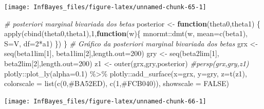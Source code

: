 \documentclass[
]{book}
\newenvironment{Shaded}{\begin{snugshade}}{\end{snugshade}}
\newcommand{\AttributeTok}[1]{\textcolor[rgb]{0.77,0.63,0.00}{#1}}
\newcommand{\CommentTok}[1]{\textcolor[rgb]{0.56,0.35,0.01}{\textit{#1}}}
\newcommand{\ConstantTok}[1]{\textcolor[rgb]{0.00,0.00,0.00}{#1}}
\newcommand{\ControlFlowTok}[1]{\textcolor[rgb]{0.13,0.29,0.53}{\textbf{#1}}}
\newcommand{\DecValTok}[1]{\textcolor[rgb]{0.00,0.00,0.81}{#1}}
\newcommand{\FloatTok}[1]{\textcolor[rgb]{0.00,0.00,0.81}{#1}}
\newcommand{\FunctionTok}[1]{\textcolor[rgb]{0.00,0.00,0.00}{#1}}
\newcommand{\NormalTok}[1]{#1}
\newcommand{\OtherTok}[1]{\textcolor[rgb]{0.56,0.35,0.01}{#1}}
\newcommand{\SpecialCharTok}[1]{\textcolor[rgb]{0.00,0.00,0.00}{#1}}
\newcommand{\StringTok}[1]{\textcolor[rgb]{0.31,0.60,0.02}{#1}}
\begin{document}
\begin{center}\texttt{[image: InfBayes\_files/figure-latex/unnamed-chunk-65-1]} \end{center}

\begin{Shaded}
\begin{Highlighting}[]
\CommentTok{\# posteriori marginal bivariada dos betas}
\NormalTok{posterior }\OtherTok{\textless{}{-}} \ControlFlowTok{function}\NormalTok{(theta0,theta1) \{ }\FunctionTok{apply}\NormalTok{(}\FunctionTok{cbind}\NormalTok{(theta0,theta1),}\DecValTok{1}\NormalTok{,}\ControlFlowTok{function}\NormalTok{(w)\{ mnormt}\SpecialCharTok{::}\FunctionTok{dmt}\NormalTok{(w, }\AttributeTok{mean=}\FunctionTok{c}\NormalTok{(beta1), }\AttributeTok{S=}\NormalTok{V, }\AttributeTok{df=}\DecValTok{2}\SpecialCharTok{*}\NormalTok{a1)  \}) \}}
\CommentTok{\# Gráfico da posteriori marginal bivariada dos betas}
\NormalTok{grx }\OtherTok{\textless{}{-}} \FunctionTok{seq}\NormalTok{(beta1lim[}\DecValTok{1}\NormalTok{], beta1lim[}\DecValTok{2}\NormalTok{],}\AttributeTok{length.out=}\DecValTok{200}\NormalTok{)}
\NormalTok{gry }\OtherTok{\textless{}{-}} \FunctionTok{seq}\NormalTok{(beta2lim[}\DecValTok{1}\NormalTok{], beta2lim[}\DecValTok{2}\NormalTok{],}\AttributeTok{length.out=}\DecValTok{200}\NormalTok{)}
\NormalTok{z1 }\OtherTok{\textless{}{-}} \FunctionTok{outer}\NormalTok{(grx,gry,posterior)}
\CommentTok{\#persp(grx,gry,z1)}
\NormalTok{plotly}\SpecialCharTok{::}\FunctionTok{plot\_ly}\NormalTok{(}\AttributeTok{alpha=}\FloatTok{0.1}\NormalTok{) }\SpecialCharTok{\%\textgreater{}\%}
\NormalTok{  plotly}\SpecialCharTok{::}\FunctionTok{add\_surface}\NormalTok{(}\AttributeTok{x=}\NormalTok{grx, }\AttributeTok{y=}\NormalTok{gry, }\AttributeTok{z=}\FunctionTok{t}\NormalTok{(z1), }\AttributeTok{colorscale =} \FunctionTok{list}\NormalTok{(}\FunctionTok{c}\NormalTok{(}\DecValTok{0}\NormalTok{,}\StringTok{\textquotesingle{}\#BA52ED\textquotesingle{}}\NormalTok{), }\FunctionTok{c}\NormalTok{(}\DecValTok{1}\NormalTok{,}\StringTok{\textquotesingle{}\#FCB040\textquotesingle{}}\NormalTok{)), }\AttributeTok{showscale =} \ConstantTok{FALSE}\NormalTok{)}
\end{Highlighting}
\end{Shaded}

\begin{center}\texttt{[image: InfBayes\_files/figure-latex/unnamed-chunk-66-1]} \end{center}
\end{document}
